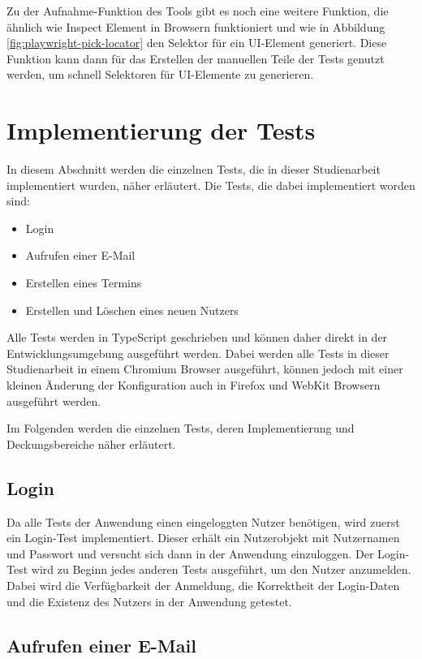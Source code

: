 Zu der Aufnahme-Funktion des Tools gibt es noch eine weitere Funktion, die ähnlich wie Inspect Element in Browsern funktioniert und wie in Abbildung \ref{fig:playwright-pick-locator} den Selektor für ein UI-Element generiert.
Diese Funktion kann dann für das Erstellen der manuellen Teile der Tests genutzt werden, um schnell Selektoren für UI-Elemente zu generieren.



\section{Implementierung der Tests}

In diesem Abschnitt werden die einzelnen Tests, die in dieser Studienarbeit implementiert wurden, näher erläutert.
Die Tests, die dabei implementiert worden sind:
\begin{itemize}
    \item Login
    \item Aufrufen einer E-Mail
    \item Erstellen eines Termins
    \item Erstellen und Löschen eines neuen Nutzers
\end{itemize}
Alle Tests werden in TypeScript geschrieben und können daher direkt in der Entwicklungsumgebung ausgeführt werden.
Dabei werden alle Tests in dieser Studienarbeit in einem Chromium Browser ausgeführt, können jedoch mit einer kleinen Änderung der Konfiguration auch in Firefox und WebKit Browsern ausgeführt werden.

Im Folgenden werden die einzelnen Tests, deren Implementierung und Deckungsbereiche näher erläutert.

\subsection*{Login}

Da alle Tests der Anwendung einen eingeloggten Nutzer benötigen, wird zuerst ein Login-Test implementiert. Dieser erhält ein Nutzerobjekt mit Nutzernamen und Passwort und versucht sich dann in der Anwendung einzuloggen.
Der Login-Test wird zu Beginn jedes anderen Tests ausgeführt, um den Nutzer anzumelden.
Dabei wird die Verfügbarkeit der Anmeldung, die Korrektheit der Login-Daten und die Existenz des Nutzers in der Anwendung getestet.

\subsection*{Aufrufen einer E-Mail}

